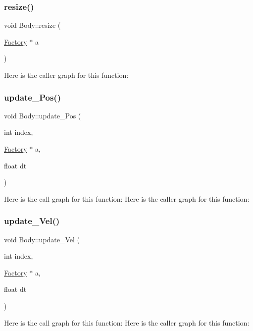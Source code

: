 \mbox{\label{namespace_body_ade37e2bc965edf7226ec2876383eb266}} 
\subsubsection{\texorpdfstring{resize()}{resize()}}
{\footnotesize\ttfamily void Body\+::resize (\begin{DoxyParamCaption}\item[{\mbox{\hyperlink{struct_body_1_1_factory}{Factory}} $\ast$}]{a }\end{DoxyParamCaption})}

Here is the caller graph for this function\+:
\mbox{\label{namespace_body_a021a17c895acfea05e10a1fdb2c20b51}} 
\subsubsection{\texorpdfstring{update\+\_\+\+Pos()}{update\_Pos()}}
{\footnotesize\ttfamily void Body\+::update\+\_\+\+Pos (\begin{DoxyParamCaption}\item[{int}]{index,  }\item[{\mbox{\hyperlink{struct_body_1_1_factory}{Factory}} $\ast$}]{a,  }\item[{float}]{dt }\end{DoxyParamCaption})}

Here is the call graph for this function\+:
Here is the caller graph for this function\+:
\mbox{\label{namespace_body_a93be1c44dee756c2e3f94603f526bed2}} 
\subsubsection{\texorpdfstring{update\+\_\+\+Vel()}{update\_Vel()}}
{\footnotesize\ttfamily void Body\+::update\+\_\+\+Vel (\begin{DoxyParamCaption}\item[{int}]{index,  }\item[{\mbox{\hyperlink{struct_body_1_1_factory}{Factory}} $\ast$}]{a,  }\item[{float}]{dt }\end{DoxyParamCaption})}

Here is the call graph for this function\+:
Here is the caller graph for this function\+:
